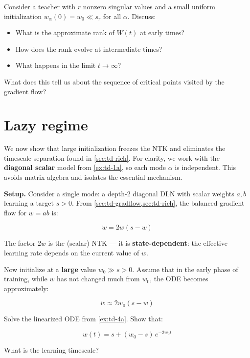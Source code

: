 \documentclass[11pt]{article}
\providecommand{\tightlist}{%
  \setlength{\itemsep}{0pt}\setlength{\parskip}{0pt}}
\begin{document}
\begin{exercise}
\label{ex:td-3c}
Consider a teacher with
\(r\) nonzero singular values and a small uniform initialization
\(w_\alpha(0) = w_0 \ll s_r\) for all \(\alpha\). Discuss:

\begin{itemize}
\tightlist
\item
  What is the approximate rank of \(W(t)\) at early times?
\item
  How does the rank evolve at intermediate times?
\item
  What happens in the limit \(t \to \infty\)?
\end{itemize}

What does this tell us about the sequence of critical points visited by
the gradient flow?
\end{exercise}


\section{Lazy regime}
\label{sec:td-lazy}

We now show that large initialization freezes the NTK and eliminates the
timescale separation found in \cref{sec:td-rich}. For clarity, we work with the
\textbf{diagonal scalar} model from \cref{ex:td-1a}, so each mode
\(\alpha\) is independent. This avoids matrix algebra and isolates the
essential mechanism.

\textbf{Setup.} Consider a single mode: a depth-2 diagonal
DLN with scalar weights \(a, b\) learning a target \(s > 0\). From
\cref{sec:td-gradflow,sec:td-rich}, the balanced gradient flow for \(w = ab\) is:

\[\dot{w} = 2w(s - w)\]

The factor \(2w\) is the (scalar) NTK --- it is
\textbf{state-dependent}: the effective learning rate depends on the
current value of \(w\).

\begin{exercise}
\label{ex:td-4a}
Now initialize at a \textbf{large} value \(w_0 \gg s > 0\). Assume that in
the early phase of training, while \(w\) has not changed much from
\(w_0\), the ODE becomes approximately:

\[\dot{w} \approx 2w_0(s - w)\]
\end{exercise}


\begin{exercise}
\label{ex:td-4b}
Solve the linearized ODE from \cref{ex:td-4a}. Show that:

\[w(t) = s + (w_0 - s)\,e^{-2w_0 t}\]

What is the learning timescale?
\end{exercise}
\end{document}
